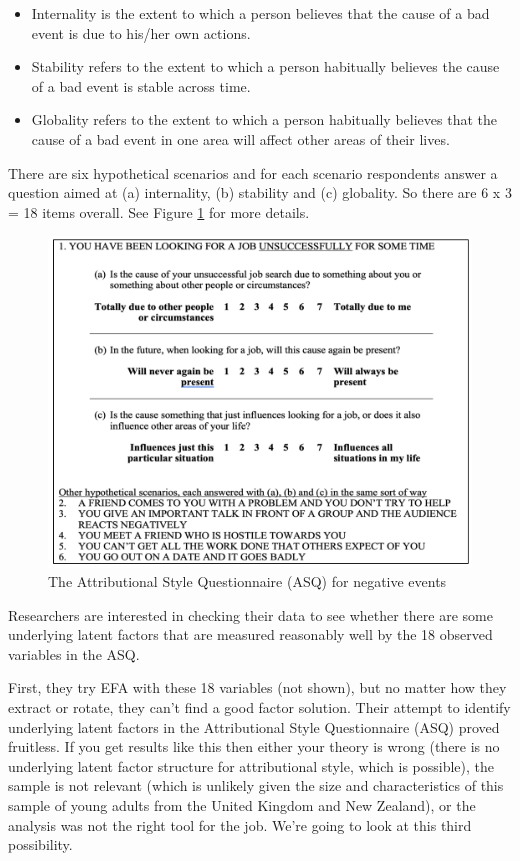 \documentclass[
]{book}
\providecommand{\tightlist}{%
  \setlength{\itemsep}{0pt}\setlength{\parskip}{0pt}}
\begin{document}
\begin{itemize}
\tightlist
\item
  Internality is the extent to which a person believes that the cause of a bad event is due to his/her own actions.
\item
  Stability refers to the extent to which a person habitually believes the cause of a bad event is stable across time.
\item
  Globality refers to the extent to which a person habitually believes that the cause of a bad event in one area will affect other areas of their lives.
\end{itemize}

There are six hypothetical scenarios and for each scenario respondents answer a question aimed at (a) internality, (b) stability and (c) globality. So there are 6 x 3 = 18 items overall. See Figure \ref{fig:MTMM1} for more details.

\begin{figure}

{\centering \includegraphics[width=1\linewidth]{img/factoranalysis/MTMM1} 

}

\caption{The Attributional Style Questionnaire (ASQ) for negative events}\label{fig:MTMM1}
\end{figure}

Researchers are interested in checking their data to see whether there are some underlying latent factors that are measured reasonably well by the 18 observed variables in the ASQ.

First, they try EFA with these 18 variables (not shown), but no matter how they extract or rotate, they can't find a good factor solution. Their attempt to identify underlying latent factors in the Attributional Style Questionnaire (ASQ) proved fruitless. If you get results like this then either your theory is wrong (there is no underlying latent factor structure for attributional style, which is possible), the sample is not relevant (which is unlikely given the size and characteristics of this sample of young adults from the United Kingdom and New Zealand), or the analysis was not the right tool for the job. We're going to look at this third possibility.
\end{document}
